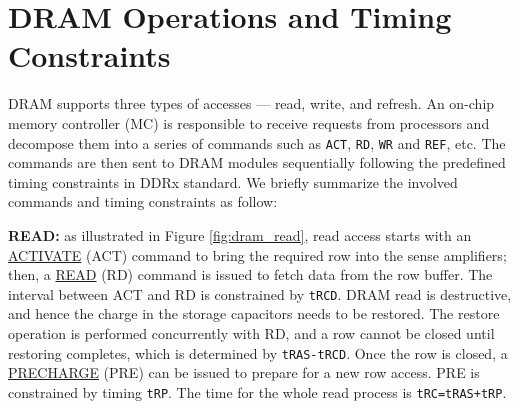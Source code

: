 \section{DRAM Operations and Timing Constraints}
DRAM supports three types of accesses --- read, write, and refresh. An on-chip memory controller (MC) is responsible to receive requests from processors and decompose them into a series of commands such as {\tt ACT}, {\tt RD}, {\tt WR} and {\tt REF}, etc.
The commands are then sent to DRAM modules sequentially following the predefined timing constraints in DDRx standard. 
We briefly summarize the involved commands and timing constraints as follow: 

\textbf{READ:} as illustrated in Figure \ref{fig:dram_read}, read access starts with an \underline{ACTIVATE} (ACT) command to bring the required row into the sense amplifiers; then, a \underline{READ} (RD) command is issued to fetch data from the row buffer. The interval between  ACT and RD is constrained by {\tt tRCD}. DRAM read is destructive, and hence the charge in the storage capacitors needs to be restored. The restore operation is performed concurrently with RD, and a row cannot be closed until restoring completes, which is determined by {\tt tRAS-tRCD}. Once the row is closed, a \underline{PRECHARGE} (PRE) can be issued to prepare for a new row access. PRE is constrained by timing {\tt tRP}. The time for the whole read process is {\tt tRC=tRAS+tRP}.

